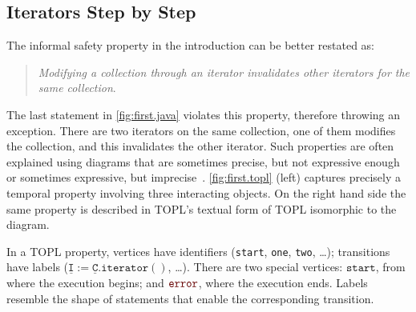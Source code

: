 \documentclass{llncs} %
\newcommand{\noterg}[2]{\textcolor{gray}{[\textcolor{red}{#1}: #2]}}
\newcommand{\dd}[1]{\noterg{dd}{#1}}
\newcommand{\dinocomment}[1]{\dd{#1}}
\newcommand{\error}{\ensuremath{\textcolor{darkred}{\mathtt{error}}}\xspace}
\newcommand{\pattern}[1]{\ensuremath{\mathtt{\underline{#1}}}}
\newcommand{\start}{\ensuremath{\mathtt{start}}\xspace}
\begin{document}
\subsection{Iterators Step by Step} \label{sec:examples.steps} %
The informal safety property in the introduction can be better restated as:
\begin{quote}
\emph{Modifying a collection through an iterator invalidates other iterators for the same collection}.
\end{quote}
\noindent
The last statement in \autoref{fig:first.java} violates this property, therefore throwing an exception.
There are two iterators on the same collection, one of them modifies the collection, and this invalidates the other iterator.
Such properties are often explained using diagrams that are sometimes precise, but not expressive enough~\cite{dblp:journals/scp/FieldGRY05,dblp:conf/issta/FinkYDRG06} or sometimes expressive, but imprecise~\cite{dblp:conf/oopsla/bierhoffa07,dblp:conf/oopsla/naeeml08,dblp:conf/sigsoft/boddenlh08,dblp:conf/ecoop/bierhoffba09}.
\autoref{fig:first.topl} (left)  captures precisely a temporal property involving three interacting objects.
On the right hand side  the same property is described in TOPL's textual form of TOPL isomorphic to the diagram.

In a TOPL property, vertices have identifiers (\texttt{start}, \texttt{one}, \texttt{two}, \dots);
transitions have labels ($\pattern I:=\pattern C.\mathtt{iterator}()$, \dots).
There are two special vertices: \start, from where the execution begins; and \error, where the execution ends.
Labels resemble the shape of statements that enable the corresponding transition.
\end{document}
